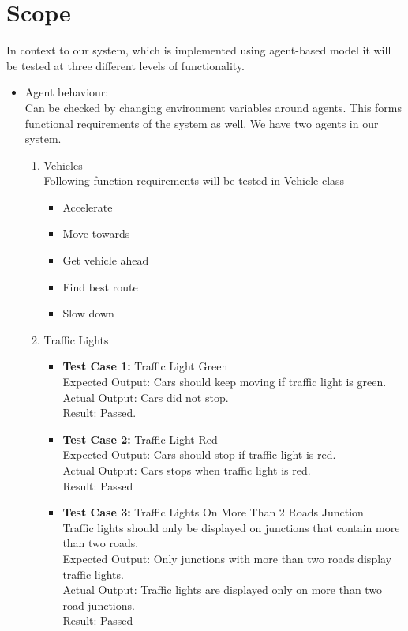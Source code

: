 \documentclass[11pt, oneside]{article}   	%
\begin{document}
\section{Scope}
In context to our system, which is implemented using agent-based model it will be tested at three different levels of functionality.
\begin{itemize}
\item Agent behaviour: \hfill \\
Can be checked by changing environment variables around agents.
This forms functional requirements of the system as well. We have two agents in our system. \begin{enumerate}
\item Vehicles\hfill \\
Following function requirements will be tested in Vehicle class

\begin{itemize}
	\item Accelerate
	\item Move towards
	\item Get vehicle ahead
	\item Find best route
	\item Slow down
\end{itemize}

\item Traffic Lights
\begin{itemize}
\item \textbf{Test Case 1:} Traffic Light Green \hfill \\
Expected Output:
Cars should keep moving if traffic light is green.\hfill \\
Actual Output:
Cars did not stop.\hfil \\
Result:
Passed.
\item \textbf{Test Case 2:} Traffic Light Red\hfill \\
 Expected Output: Cars should stop if traffic light is red.\hfill \\
 Actual Output: Cars stops when traffic light is red.\hfill \\
 Result: Passed
 
 \item \textbf{Test Case 3:} Traffic Lights On More Than 2 Roads Junction\hfill \\
 Traffic lights should only be displayed on junctions that contain more than two roads.\hfill \\
 Expected Output: Only junctions with more than two roads display traffic lights.\hfill \\
 Actual Output: Traffic lights are displayed only on more than two road junctions.\hfill \\
 Result: Passed
\end{itemize}


\end{enumerate}
\end{itemize}
\end{document}
